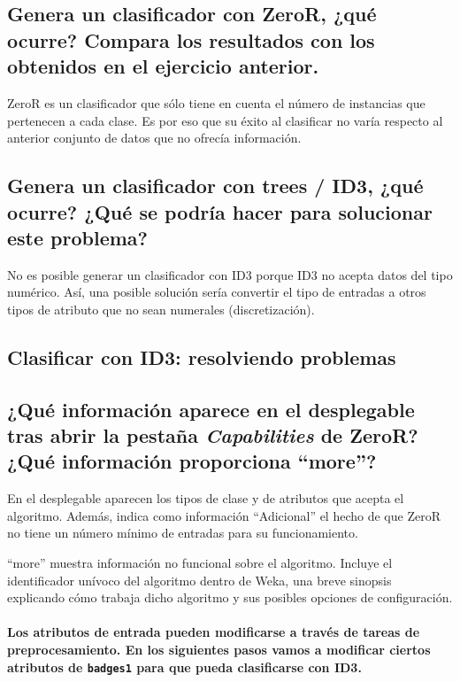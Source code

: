 \documentclass[12pt]{article}
\begin{document}
\subsection*{\small Genera un clasificador con ZeroR, ¿qué ocurre? Compara los
resultados con los obtenidos en el ejercicio anterior.}

ZeroR es un clasificador que sólo tiene en cuenta el número de instancias
que pertenecen a cada clase. Es por eso que su éxito al clasificar no varía
respecto al anterior conjunto de datos que no ofrecía información.

\subsection*{\small Genera un clasificador con trees / ID3, ¿qué ocurre? ¿Qué se
podría hacer para solucionar este problema?}

No es posible generar un clasificador con ID3 porque ID3 no acepta datos del
tipo numérico. Así, una posible solución sería convertir el tipo de entradas a
otros tipos de atributo que no sean numerales (discretización).

\newpage

\begin{center}
\section{Clasificar con ID3: resolviendo problemas}
\end{center}

\subsection*{\small ¿Qué información aparece en el desplegable tras abrir la
pestaña \emph{Capabilities} de ZeroR? ¿Qué información proporciona ``more''?}

En el desplegable aparecen los tipos de clase y de atributos que acepta el
algoritmo. Además, indica como información ``Adicional'' el hecho de que ZeroR
no tiene un número mínimo de entradas para su funcionamiento.

``more'' muestra información no funcional sobre el algoritmo. Incluye el
identificador unívoco del algoritmo dentro de Weka, una breve sinopsis
explicando cómo trabaja dicho algoritmo y sus posibles opciones de
configuración.

\paragraph{\small Los atributos de entrada pueden modificarse a través de
tareas de preprocesamiento. En los siguientes pasos vamos a modificar ciertos
atributos de \texttt{badges1} para que pueda clasificarse con ID3.}
\end{document}
